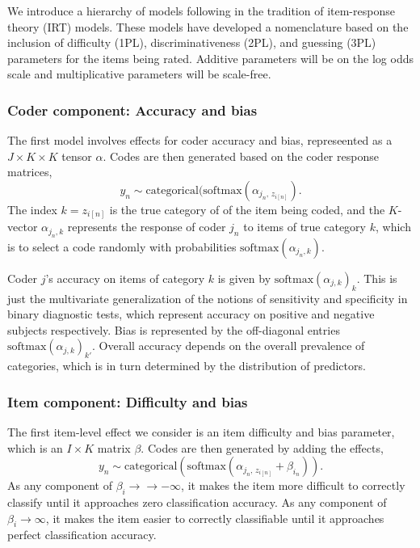 \documentclass[10pt]{article}
\begin{document}
We introduce a hierarchy of models following in the tradition of
item-response theory (IRT) models.  These models have developed a
nomenclature based on the inclusion of difficulty (1PL),
discriminativeness (2PL), and guessing (3PL) parameters for the items
being rated.  Additive parameters will be on the log odds scale and
multiplicative parameters will be scale-free.

\subsubsection*{Coder component: Accuracy and bias}

The first model involves effects for coder accuracy and bias,
represeented as a $J \times K \times K$ tensor $\alpha$.  Codes are then
generated based on the coder response matrices, 
\[
  y_n \sim \textrm{categorical}(\textrm{softmax}(\alpha_{j_n,\, z_{i[n]}}).
\]
The index $k = z_{i[n]}$ is the true category of of the item being coded,
and the $K$-vector $\alpha_{j_n, k}$ represents the response of coder $j_n$ to
items of true category $k$, which is to select a code randomly
with probabilities $\textrm{softmax}(\alpha_{j_n, k})$.

Coder $j$'s accuracy on items of category $k$ is given by
$\textrm{softmax}(\alpha_{j, k})_k$.  This is just the multivariate
generalization of the notions of sensitivity and specificity in binary
diagnostic tests, which represent accuracy on positive and negative
subjects respectively.  Bias is represented by the off-diagonal entries
$\textrm{softmax}(\alpha_{j, k})_{k'}$.   Overall accuracy depends on
the overall prevalence of categories, which is in turn determined by
the distribution of predictors.

\subsubsection*{Item component: Difficulty and bias}

The first item-level effect we consider is an item difficulty and bias
parameter, which is an $I \times K$ matrix $\beta$.  Codes are then
generated by adding the effects,
\[
  y_n \sim \textrm{categorical}(\textrm{softmax}(\alpha_{j_n,\,
    z_{i[n]}} + \beta_{i_n})).
\]
As any component of $\beta_i \rightarrow \rightarrow -\infty$, it
makes the item more difficult to correctly classify until it
approaches zero classification accuracy.  As any component of $\beta_i
\rightarrow \infty$, it makes the item easier to correctly
classifiable until it approaches perfect classification accuracy.
\end{document}
